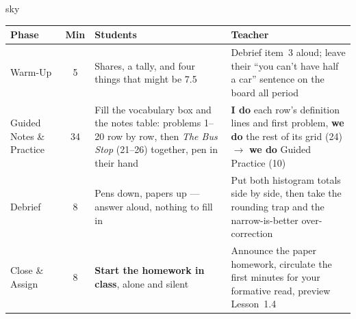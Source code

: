 \documentclass[10pt]{article}
\begin{document}
\boxguard[30]
\begin{skillbox}{sky}
\renewcommand{\arraystretch}{1.25}
\begin{tabularx}{\linewidth}{@{}l c X X@{}}
\textbf{Phase} & \textbf{Min} & \textbf{Students} & \textbf{Teacher} \\
\hline
Warm-Up & 5 & Shares, a tally, and four things that might be 7.5 & Debrief item~3 aloud; leave their ``you can't have half a car'' sentence on the board all period \\
Guided Notes \& Practice & 34 & Fill the vocabulary box and the notes table: problems 1--20 row by row, then \emph{The Bus Stop} (21--26) together, pen in their hand & \textbf{I do} each row's definition lines and first problem, \textbf{we do} the rest of its grid (24) $\to$ \textbf{we do} Guided Practice (10) \\
Debrief & 8 & Pens down, papers up --- answer aloud, nothing to fill in & Put both histogram totals side by side, then take the rounding trap and the narrow-is-better over-correction \\
Close \& Assign & 8 & \textbf{Start the homework in class}, alone and silent & Announce the paper homework, circulate the first minutes for your formative read, preview Lesson~1.4 \\
\end{tabularx}
\end{skillbox}
\end{document}
